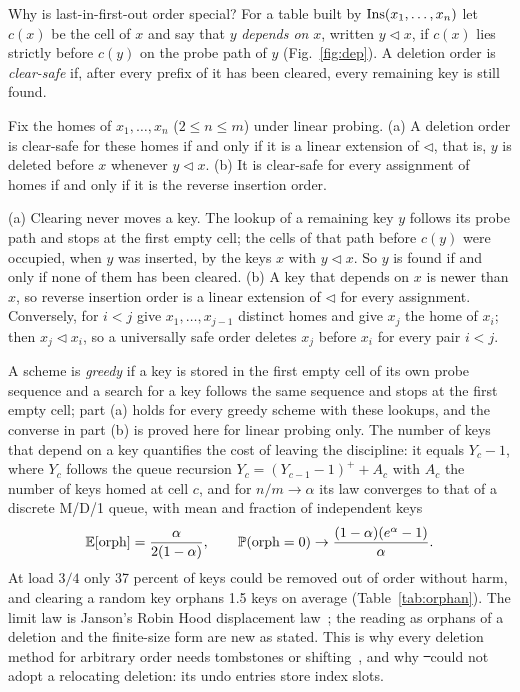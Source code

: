 Why is last-in-first-out order special? For a table built by $\mathrm{Ins}(x_1,\ldots,x_n)$ let $c(x)$ be the cell of $x$ and say that $y$ \emph{depends on} $x$, written $y \lhd x$, if $c(x)$ lies strictly before $c(y)$ on the probe path of $y$ (Fig.~\ref{fig:dep}). A deletion order is \emph{clear-safe} if, after every prefix of it has been cleared, every remaining key is still found.

\begin{theorem}
\label{thm:exact}
Fix the homes of $x_1,\ldots,x_n$ ($2\le n\le m$) under linear probing. (a) A deletion order is clear-safe for these homes if and only if it is a linear extension of $\lhd$, that is, $y$ is deleted before $x$ whenever $y \lhd x$. (b) It is clear-safe for every assignment of homes if and only if it is the reverse insertion order.
\end{theorem}

\begin{IEEEproof}
(a) Clearing never moves a key. The lookup of a remaining key $y$ follows its probe path and stops at the first empty cell; the cells of that path before $c(y)$ were occupied, when $y$ was inserted, by the keys $x$ with $y\lhd x$. So $y$ is found if and only if none of them has been cleared. (b) A key that depends on $x$ is newer than $x$, so reverse insertion order is a linear extension of $\lhd$ for every assignment. Conversely, for $i<j$ give $x_1,\ldots,x_{j-1}$ distinct homes and give $x_j$ the home of $x_i$; then $x_j \lhd x_i$, so a universally safe order deletes $x_j$ before $x_i$ for every pair $i<j$.
\end{IEEEproof}

A scheme is \emph{greedy} if a key is stored in the first empty cell of its own probe sequence and a search for a key follows the same sequence and stops at the first empty cell; part (a) holds for every greedy scheme with these lookups, and the converse in part (b) is proved here for linear probing only. The number of keys that depend on a key quantifies the cost of leaving the discipline: it equals $Y_c-1$, where $Y_c$ follows the queue recursion $Y_c=(Y_{c-1}-1)^{+}+A_c$ with $A_c$ the number of keys homed at cell $c$, and for $n/m\to\alpha$ its law converges to that of a discrete M/D/1 queue, with mean and fraction of independent keys
\begin{equation}
\mathbb{E}[\mathrm{orph}]=\frac{\alpha}{2(1-\alpha)},\qquad \mathbb{P}(\mathrm{orph}=0)\to\frac{(1-\alpha)(e^{\alpha}-1)}{\alpha}.
\label{eq:orphan}
\end{equation}
At load $3/4$ only 37 percent of keys could be removed out of order without harm, and clearing a random key orphans 1.5 keys on average (Table~\ref{tab:orphan}). The limit law is Janson's Robin Hood displacement law~\cite{janson2005}; the reading as orphans of a deletion and the finite-size form are new as stated. This is why every deletion method for arbitrary order needs tombstones or shifting~\cite{knuth3,bender2021}, and why \st\ could not adopt a relocating deletion: its undo entries store index slots.

